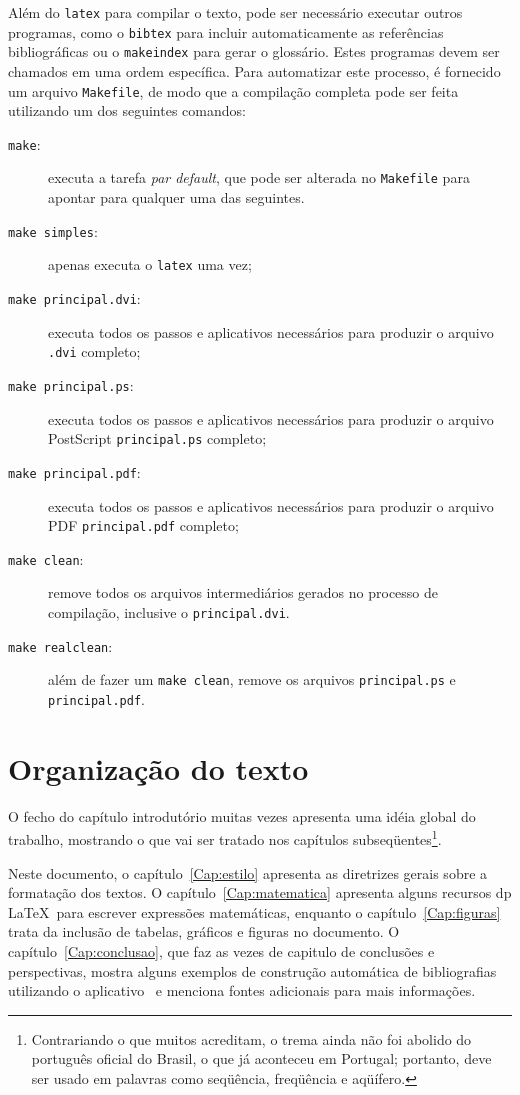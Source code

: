Além do \texttt{latex} para compilar o texto, pode ser necessário
executar outros programas, como o \texttt{bibtex} para incluir
automaticamente as referências bibliográficas ou o \texttt{makeindex}
para gerar o glossário. Estes programas devem ser chamados em uma
ordem específica. Para automatizar este processo, é fornecido um
arquivo \texttt{Makefile}, de modo que a compilação completa pode
ser feita utilizando um dos seguintes comandos:%
%
\begin{description}
\item[{\tt make}:] executa a tarefa \emph{par default}, que pode ser
alterada no \texttt{Makefile} para apontar para qualquer uma das seguintes.
\item[{\tt make simples}:] apenas executa o \texttt{latex} uma vez;
\item[{\tt make principal.dvi}:] executa todos os passos e aplicativos
necessários para produzir o arquivo \texttt{.dvi} completo;
\item[{\tt make principal.ps}:] executa todos os passos e aplicativos
necessários para produzir o arquivo PostScript \texttt{principal.ps}
completo;
\item[{\tt make principal.pdf}:] executa todos os passos e aplicativos
necessários para produzir o arquivo PDF \texttt{principal.pdf} completo;
\item[{\tt make clean}:] remove todos os arquivos intermediários gerados
no processo de compilação, inclusive o \texttt{principal.dvi}.
\item[{\tt make realclean}:] além de fazer um \texttt{make clean}, remove
os arquivos \texttt{principal.ps} e \texttt{principal.pdf}.
\end{description}

\section{Organização do texto}

O fecho do capítulo introdutório muitas vezes apresenta uma idéia
global do trabalho, mostrando o que vai ser tratado nos capítulos
subseqüentes\footnote{Contrariando o que muitos acreditam, o trema
ainda não foi abolido do português oficial do Brasil, o que já
aconteceu em Portugal; portanto, deve ser usado em palavras como
seqüência, freqüência e aqüífero.}.

Neste documento, o capítulo~\ref{Cap:estilo} apresenta as diretrizes
gerais sobre a formatação dos textos. O capítulo~\ref{Cap:matematica}
apresenta alguns recursos dp \LaTeX\ para escrever expressões
matemáticas, enquanto o capítulo~\ref{Cap:figuras} trata da inclusão
de tabelas, gráficos e figuras no documento. O
capítulo~\ref{Cap:conclusao}, que faz as vezes de capitulo de
conclusões e perspectivas, mostra alguns exemplos de construção
automática de bibliografias utilizando o aplicativo \BibTeX\ e
menciona fontes adicionais para mais informações.


